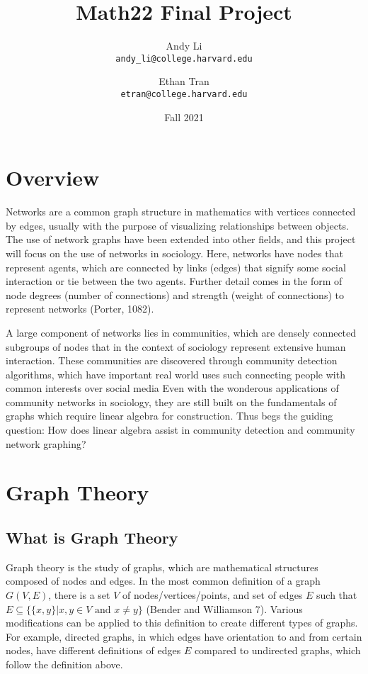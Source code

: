 \documentclass{article}
\title{Math22 Final Project}
\date{Fall 2021}
\author{Andy Li\\ \texttt{andy\_li@college.harvard.edu} \and Ethan Tran\\ \texttt{etran@college.harvard.edu}}
\begin{document}
\maketitle

\pagebreak

\tableofcontents

\section{Overview}
Networks are a common graph structure in mathematics with vertices connected by edges, usually with the purpose of visualizing relationships between objects.
The use of network graphs have been extended into other fields, and this project will focus on the use of networks in sociology.
Here, networks have nodes that represent agents, which are connected by links (edges) that signify some social interaction or tie between the two agents.
Further detail comes in the form of node degrees (number of connections) and strength (weight of connections) to represent networks (Porter, 1082). 
 
A large component of networks lies in communities, which are densely connected subgroups of nodes that in the context of sociology represent extensive human interaction.
These communities are discovered through community detection algorithms, which have important real world uses such connecting people with common interests over social media
Even with the wonderous applications of community networks in sociology, they are still built on the fundamentals of graphs which require linear algebra for construction. 
Thus begs the guiding question:
How does linear algebra assist in community detection and community network graphing?

\section{Graph Theory}

\subsection{What is Graph Theory}
Graph theory is the study of graphs, which are mathematical structures composed of nodes and edges. In the most common definition of a graph $G(V, E)$, there is a set $V$ of nodes/vertices/points, and set of edges $E$ such that \\$E \subseteq \{\{x, y\} | x, y \in V \text{ and } x \neq y\}$ (Bender and Williamson 7). Various modifications can be applied to this definition to create different types of graphs. For example, directed graphs, in which edges have orientation to and from certain nodes, have different definitions of edges $E$ compared to undirected graphs, which follow the definition above.   
\end{document}
